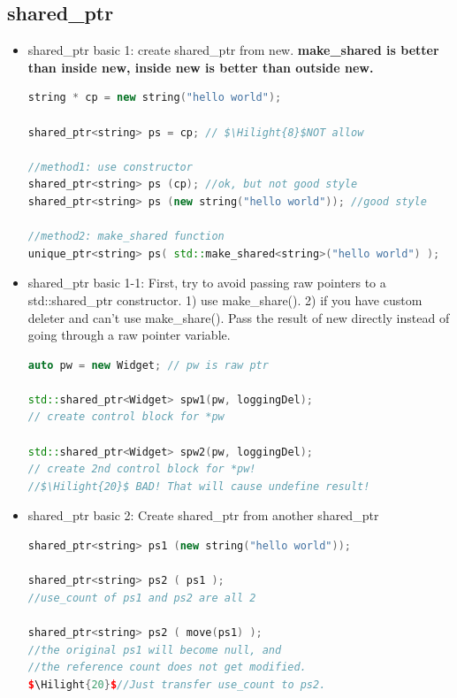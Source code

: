 \documentclass[a4paper,12pt,twoside]{book}
\newcommand{\Hilight}[1]{\makebox[0pt][l]{\color{yellow}\rule[-3pt]{#1em}{11pt}}}
\begin{document}
\subsection{shared\_ptr}
\begin{itemize}
\item shared\_ptr basic 1: create shared\_ptr from new. \textbf{make\_shared is better than inside new, inside new is better than outside new.}
\begin{lstlisting}[frame=single, language=c++]
string * cp = new string("hello world");

shared_ptr<string> ps = cp; // $\Hilight{8}$NOT allow

//method1: use constructor
shared_ptr<string> ps (cp); //ok, but not good style
shared_ptr<string> ps (new string("hello world")); //good style

//method2: make_shared function
unique_ptr<string> ps( std::make_shared<string>("hello world") );
\end{lstlisting}

\item shared\_ptr basic 1-1: First, try to avoid passing raw pointers to a std::shared\_ptr constructor. 1) use make\_share(). 2) if you have custom deleter and can't use make\_share().  Pass the result of new directly instead of going through a raw pointer variable.

\begin{lstlisting}[frame=single, language=c++]
auto pw = new Widget; // pw is raw ptr

std::shared_ptr<Widget> spw1(pw, loggingDel);
// create control block for *pw

std::shared_ptr<Widget> spw2(pw, loggingDel);
// create 2nd control block for *pw!
//$\Hilight{20}$ BAD! That will cause undefine result!
\end{lstlisting}

\item shared\_ptr basic 2: Create shared\_ptr from another shared\_ptr
\begin{lstlisting}[frame=single, language=c++, mathescape=true]
shared_ptr<string> ps1 (new string("hello world"));

shared_ptr<string> ps2 ( ps1 );
//use_count of ps1 and ps2 are all 2

shared_ptr<string> ps2 ( move(ps1) );
//the original ps1 will become null, and
//the reference count does not get modified.
$\Hilight{20}$//Just transfer use_count to ps2. 
\end{lstlisting}


\end{itemize}
\end{document}
